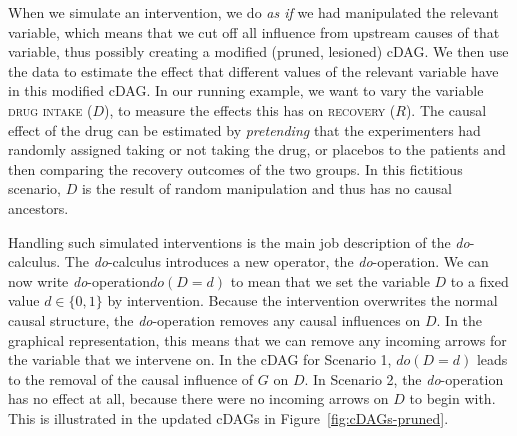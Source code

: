 \documentclass[nobib]{tufte-handout}
\newcommand{\docalc}{\emph{do}-calculus\xspace}
\newcommand{\doop}{\emph{do}-operation\xspace}
\newcommand{\mathdo}{\mathit{do}}
\begin{document}
When we simulate an intervention, we do \textit{as if} we had manipulated the relevant variable, which means that we cut off all influence from upstream causes of that variable, thus possibly creating a modified (pruned, lesioned) cDAG.
We then use the data to estimate the effect that different values of the relevant variable have in this modified cDAG.
In our running example, we want to vary the variable \textsc{drug intake} ($D$), to measure the effects this has on \textsc{recovery} ($R$).
The causal effect of the drug can be estimated by \textit{pretending} that the experimenters had randomly assigned taking or not taking the drug, or placebos to the patients and then comparing the recovery outcomes of the two groups.
In this fictitious scenario, $D$ is the result of random manipulation and thus has no causal ancestors.

Handling such simulated interventions is the main job description of the \docalc. 
The \docalc introduces a new operator, the \doop.
We can now write \doop $\mathdo(D=d)$ to mean that we set the variable $D$ to a fixed value $d \in \{0,1\}$ by intervention.
Because the intervention overwrites the normal causal structure, the \doop removes any causal influences on $D$.
In the graphical representation, this means that we can remove any incoming arrows for the variable that we intervene on.
In the cDAG for Scenario 1, $\mathdo(D=d)$ leads to the removal of the causal influence of $G$ on $D$.
In Scenario 2, the \doop has no effect at all, because there were no incoming arrows on $D$ to begin with.
This is illustrated in the updated cDAGs in Figure~\ref{fig:cDAGs-pruned}.
\end{document}
